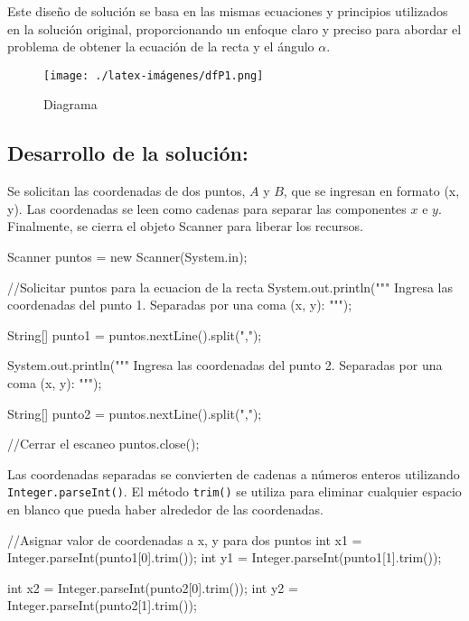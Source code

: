 Este diseño de solución se basa en las mismas ecuaciones y principios utilizados en la solución original, proporcionando un enfoque claro y preciso para abordar el problema de obtener la ecuación de la recta y el ángulo \(\alpha\).
\begin{figure}[h!]
    \centering
    \texttt{[image: ./latex-imágenes/dfP1.png]}
    \caption{Diagrama }
    \label{fig:enter-label}
\end{figure}
\subsection{\textbf{Desarrollo de la solución:}}

Se solicitan las coordenadas de dos puntos, \(A\) y \(B\), que se ingresan en formato (x, y). Las coordenadas se leen como cadenas para separar las componentes \(x\) e \(y\). Finalmente, se cierra el objeto Scanner para liberar los recursos.

    \begin{javaCode}
        Scanner puntos = new Scanner(System.in);
        
        //Solicitar puntos para la ecuacion de la recta
        System.out.println("""
                            Ingresa las coordenadas del punto 1.
                            Separadas por una coma (x, y):
                            """);

    \end{javaCode}
    \begin{javaCode}
        String[] punto1 = puntos.nextLine().split(",");
        
        System.out.println("""
                            Ingresa las coordenadas del punto 2.
                            Separadas por una coma (x, y):
                            """);
        
        String[] punto2 = puntos.nextLine().split(",");
        
        //Cerrar el escaneo
        puntos.close();
    \end{javaCode}

Las coordenadas separadas se convierten de cadenas a números enteros utilizando \texttt{Integer.parseInt()}. El método \texttt{trim()} se utiliza para eliminar cualquier espacio en blanco que pueda haber alrededor de las coordenadas.

    \begin{javaCode}
        //Asignar valor de coordenadas a x, y para dos puntos
        int x1 = Integer.parseInt(punto1[0].trim());
        int y1 = Integer.parseInt(punto1[1].trim());
        
        int x2 = Integer.parseInt(punto2[0].trim());
        int y2 = Integer.parseInt(punto2[1].trim());
    \end{javaCode}

